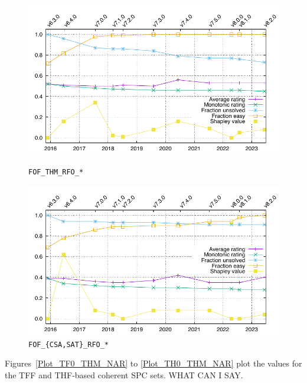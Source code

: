 \documentclass[runningheads]{llncs}
\begin{document}
\begin{figure}[h!]
\centering
\begin{minipage}[t]{.49\textwidth}
  \centering
  \includegraphics[width=\textwidth]{Plots/GNUPlots/FOF_THM_RFO.pdf}
  \vspace*{-2em}
  \caption{{\tt FOF\_THM\_RFO\_*}}
  \label{Plot_FOF_THM_RFO}
\end{minipage}
\begin{minipage}[t]{.49\textwidth}
  \centering
  \includegraphics[width=\textwidth]{Plots/GNUPlots/FOF_CSA_SAT_RFO.pdf}
  \vspace*{-2em}
  \caption{{\tt FOF\_\{CSA,SAT\}\_RFO\_*}}
  \label{Plot_FOF_CSA_SAT_RFO}
\end{minipage}
\end{figure}

Figures~\ref{Plot_TF0_THM_NAR} to \ref{Plot_TH0_THM_NAR} plot the values for the TFF and
THF-based coherent SPC sets.
WHAT CAN I SAY.
\end{document}
